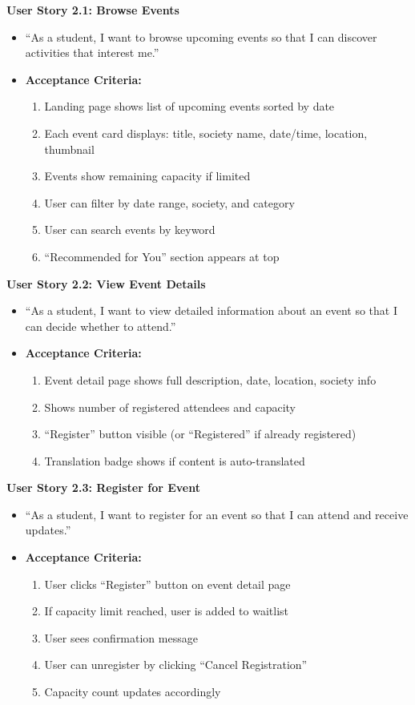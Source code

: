 \documentclass[12pt,a4paper]{article}
\begin{document}
\textbf{User Story 2.1: Browse Events}
\begin{itemize}
    \item ``As a student, I want to browse upcoming events so that I can discover activities that interest me.''
    \item \textbf{Acceptance Criteria:}
    \begin{enumerate}
        \item Landing page shows list of upcoming events sorted by date
        \item Each event card displays: title, society name, date/time, location, thumbnail
        \item Events show remaining capacity if limited
        \item User can filter by date range, society, and category
        \item User can search events by keyword
        \item ``Recommended for You'' section appears at top
    \end{enumerate}
\end{itemize}

\textbf{User Story 2.2: View Event Details}
\begin{itemize}
    \item ``As a student, I want to view detailed information about an event so that I can decide whether to attend.''
    \item \textbf{Acceptance Criteria:}
    \begin{enumerate}
        \item Event detail page shows full description, date, location, society info
        \item Shows number of registered attendees and capacity
        \item ``Register'' button visible (or ``Registered'' if already registered)
        \item Translation badge shows if content is auto-translated
    \end{enumerate}
\end{itemize}

\textbf{User Story 2.3: Register for Event}
\begin{itemize}
    \item ``As a student, I want to register for an event so that I can attend and receive updates.''
    \item \textbf{Acceptance Criteria:}
    \begin{enumerate}
        \item User clicks ``Register'' button on event detail page
        \item If capacity limit reached, user is added to waitlist
        \item User sees confirmation message
        \item User can unregister by clicking ``Cancel Registration''
        \item Capacity count updates accordingly
    \end{enumerate}
\end{itemize}
\end{document}
